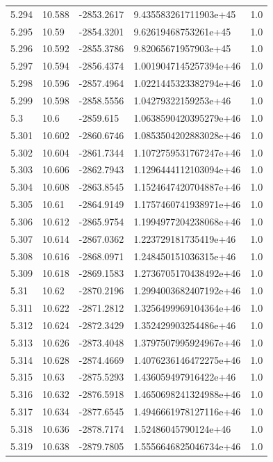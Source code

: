 \begin{tabular}{lllll}
5.294 & 10.588 & -2853.2617 & 9.435583261711903e+45 & 1.0 \\
5.295 & 10.59 & -2854.3201 & 9.62619468753261e+45 & 1.0 \\
5.296 & 10.592 & -2855.3786 & 9.82065671957903e+45 & 1.0 \\
5.297 & 10.594 & -2856.4374 & 1.0019047145257394e+46 & 1.0 \\
5.298 & 10.596 & -2857.4964 & 1.0221445323382794e+46 & 1.0 \\
5.299 & 10.598 & -2858.5556 & 1.04279322159253e+46 & 1.0 \\
5.3 & 10.6 & -2859.615 & 1.0638590420395279e+46 & 1.0 \\
5.301 & 10.602 & -2860.6746 & 1.0853504202883028e+46 & 1.0 \\
5.302 & 10.604 & -2861.7344 & 1.1072759531767247e+46 & 1.0 \\
5.303 & 10.606 & -2862.7943 & 1.1296444112103094e+46 & 1.0 \\
5.304 & 10.608 & -2863.8545 & 1.1524647420704887e+46 & 1.0 \\
5.305 & 10.61 & -2864.9149 & 1.1757460741938971e+46 & 1.0 \\
5.306 & 10.612 & -2865.9754 & 1.1994977204238068e+46 & 1.0 \\
5.307 & 10.614 & -2867.0362 & 1.223729181735419e+46 & 1.0 \\
5.308 & 10.616 & -2868.0971 & 1.248450151036315e+46 & 1.0 \\
5.309 & 10.618 & -2869.1583 & 1.2736705170438492e+46 & 1.0 \\
5.31 & 10.62 & -2870.2196 & 1.2994003682407192e+46 & 1.0 \\
5.311 & 10.622 & -2871.2812 & 1.3256499969104364e+46 & 1.0 \\
5.312 & 10.624 & -2872.3429 & 1.352429903254486e+46 & 1.0 \\
5.313 & 10.626 & -2873.4048 & 1.3797507995924967e+46 & 1.0 \\
5.314 & 10.628 & -2874.4669 & 1.4076236146472275e+46 & 1.0 \\
5.315 & 10.63 & -2875.5293 & 1.436059497916422e+46 & 1.0 \\
5.316 & 10.632 & -2876.5918 & 1.4650698241324988e+46 & 1.0 \\
5.317 & 10.634 & -2877.6545 & 1.4946661978127116e+46 & 1.0 \\
5.318 & 10.636 & -2878.7174 & 1.52486045790124e+46 & 1.0 \\
5.319 & 10.638 & -2879.7805 & 1.5556646825046734e+46 & 1.0 \\

\end{tabular}
